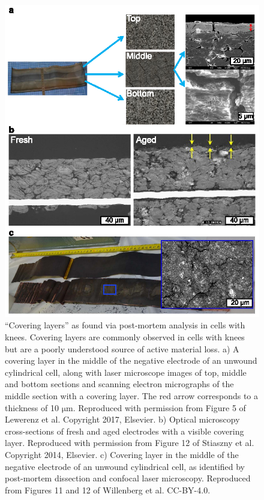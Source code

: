 \documentclass[journal=jpclcd,manuscript=article]{achemso}
\begin{document}
\begin{figure}[ht!]
\centering
\includegraphics[scale = 1.0]{figures/CoveringLayers.eps}
\caption{``Covering layers'' as found via post-mortem analysis in cells with knees. Covering layers are commonly observed in cells with knees but are a poorly understood source of active material loss.
a) A covering layer in the middle of the negative electrode of an unwound cylindrical cell, along with laser microscope images of top, middle and bottom sections and scanning electron micrographs of the middle section with a covering layer. The red arrow corresponds to a thickness of 10 $\mathrm{\mu m}$. Reproduced with permission from Figure 5 of Lewerenz et al. \cite{lewerenz_post-mortem_2017} Copyright 2017, Elsevier. b) Optical microscopy cross-sections of fresh and aged electrodes with a visible covering layer. Reproduced with permission from Figure 12 of Stiaszny et al. \cite{stiaszny_electrochemical_2014} Copyright 2014, Elsevier. c) Covering layer in the middle of the negative electrode of an unwound cylindrical cell, as identified by post-mortem dissection and confocal laser microscopy. Reproduced from Figures 11 and 12 of Willenberg et al.\cite{willenberg_development_2020} CC-BY-4.0.} 
\label{fig:covering_layers}
\end{figure}
\end{document}
